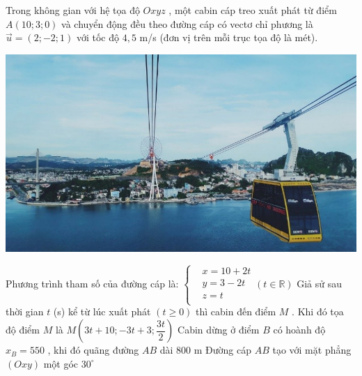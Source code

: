 \begin{ex}%
	Trong không gian với hệ tọa độ $Oxyz$ , một cabin cáp treo xuất phát từ điểm $A\left(10;3;0\right)$ và chuyển động đều theo đường cáp có vectơ chỉ phương là $\vec{u}=\left(2;-2;1\right)$ với tốc độ $4,5$ m/s (đơn vị trên mỗi trục tọa độ là mét).\\
	\centerline{\includegraphics{images/3.16.jpg}}
	\choiceTF
	{\True Phương trình tham số của đường cáp là: $\left\{\begin{aligned}
				 & x=10+2t \\
				 & y=3-2t  \\
				 & z=t     \\
			\end{aligned}\right.\left(t\in\mathbb{R}\right)$}
	{\True Giả sử sau thời gian $t$ (s) kể từ lúc xuất phát $\left(t\ge 0\right)$ thì cabin đến điểm $M$ . Khi đó tọa độ điểm $M$ là $M\left(3t+10;-3t+3;\dfrac{3t}{2}\right)$}
	{Cabin dừng ở điểm $B$ có hoành độ $x_B=550$ , khi đó quãng đường $AB$ dài 800 m}
	{Đường cáp $AB$ tạo với mặt phẳng $\left(Oxy\right)$ một góc $30^\circ $}
\end{ex}
